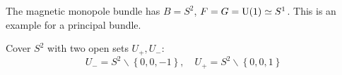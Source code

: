 \documentclass[a4paper,11pt]{article}
\begin{document}
    \begin{ex}
        The magnetic monopole bundle has $B=S^2$, $F = G = \U(1) \simeq S^1$. This is an example for a principal bundle.

        Cover $S^2$ with two open sets $U_+, U_-$: 
        \begin{equation}
            U_- = S^2 \backslash \left\{ 0,0,-1 \right\}, \quad U_+ = S^2 \backslash \left\{ 0,0,1 \right\}
        \end{equation}
        \begin{center}
            


\begin{tikzpicture}[x=0.75pt,y=0.75pt,yscale=-0.75,xscale=0.75]


\end{tikzpicture}
\end{center}
\end{ex}
\end{document}
